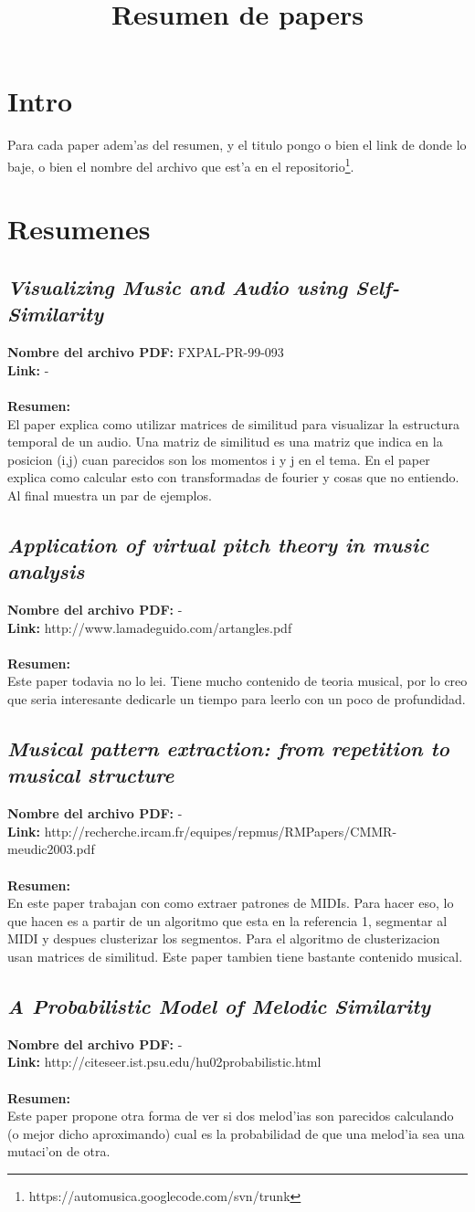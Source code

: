 \documentclass[a4paper,10pt]{article}
\title{Resumen de papers}
\author{}
\newcommand{\titulo}[1]{\def\Titulo{#1}}
\newcommand{\resumen}[1]{\def\Resumen{#1}}
\newcommand{\archivo}[1]{\def\Archivo{#1}}
\newcommand{\link}[1]{\def\Link{#1}}
\newcommand{\id}[1]{\def\Id{#1}}
\newenvironment{resumenpaper}{
\let\Titulo\empty
\let\Resumen\empty
\let\Archivo-
\let\Link-
\let\Id\empty
}{
\subsection{\textit{\Titulo}}
\label{\Id}
\noindent \textbf{Nombre del archivo PDF: }{\Archivo}\\
\noindent \textbf{Link: }{\Link}\\ \\
\noindent \textbf{Resumen:} \\ {\Resumen}
}
\begin{document}
\maketitle

\section{Intro}
Para cada paper adem'as del resumen, y el titulo pongo o bien el link de donde lo baje, o bien el nombre del archivo que est'a en el repositorio\footnote{https://automusica.googlecode.com/svn/trunk}. 

\section{Resumenes}
\begin{resumenpaper}
\titulo{Visualizing Music and Audio using Self-Similarity}
\archivo{FXPAL-PR-99-093}
\resumen{El paper explica como utilizar matrices de similitud para visualizar la estructura temporal de un audio. Una matriz de similitud es una matriz que indica en la posicion (i,j) cuan parecidos son los momentos i y j en el tema. En el paper explica como calcular esto con transformadas de fourier y cosas que no entiendo. Al final muestra un par de ejemplos.}
\end{resumenpaper}

\begin{resumenpaper}
 \titulo{Application of virtual pitch theory in music analysis}
 \link{http://www.lamadeguido.com/artangles.pdf}
 \resumen{Este paper todavia no lo lei. Tiene mucho contenido de teoria musical, por lo creo que seria interesante dedicarle un tiempo para leerlo con un poco de profundidad.}
\end{resumenpaper}

\begin{resumenpaper}
 \titulo{Musical pattern extraction: from repetition to musical structure}
 \link{http://recherche.ircam.fr/equipes/repmus/RMPapers/CMMR-meudic2003.pdf}
 \id{MusicPatternExtrMidi}
 \resumen{En este paper trabajan con como extraer patrones de MIDIs. Para hacer eso, lo que hacen es a partir de un algoritmo que esta en la referencia 1, segmentar al MIDI y despues clusterizar los segmentos. Para el algoritmo de clusterizacion usan matrices de similitud. Este paper tambien tiene bastante contenido musical.}
 
\end{resumenpaper}

\begin{resumenpaper}
 \titulo{A Probabilistic Model of Melodic Similarity}
 \link{http://citeseer.ist.psu.edu/hu02probabilistic.html}
 \resumen{Este paper propone otra forma de ver si dos melod'ias son parecidos calculando (o mejor dicho aproximando) cual es la probabilidad de que una melod'ia sea una mutaci'on de otra.}
\end{resumenpaper}
\end{document}
